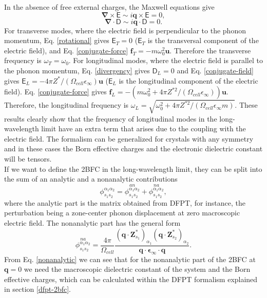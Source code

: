 In the absence of free external charges, the Maxwell equations give
\begin{equation}
 \label{rotational}
\boldsymbol{\nabla}\times\boldsymbol{\mathsf{E}}\sim i\mathbf{q}\times\boldsymbol{\mathsf{E}}=0,
\end{equation}
\begin{equation}
 \label{divergency}
\boldsymbol{\nabla}\cdot\boldsymbol{\mathsf{D}}\sim i\mathbf{q}\cdot\boldsymbol{\mathsf{D}}=0.
\end{equation}
For transverse modes, where the electric field is perpendicular to the phonon momentum, Eq. \ref{rotational} gives $\boldsymbol{\mathsf{E}}_{T}=0$ ($\boldsymbol{\mathsf{E}}_{T}$ is the transversal component of the electric 
field), and Eq. \ref{conjugate-force} $\mathbf{f}_{T}=-m\omega_{0}^{2}\mathbf{u}$. Therefore the transverse frequency is $\omega_{T}=\omega_{0}$. For longitudinal modes, where the electric field is parallel to the phonon 
momentum, Eq. \ref{divergency} gives $\boldsymbol{\mathsf{D}}_{L}=0$ and Eq. \ref{conjugate-field} gives $\boldsymbol{\mathsf{E}}_{L}=-4\pi Z^{*}/(\Omega_{cell}\epsilon_{\infty})\mathbf{u}$ ($\boldsymbol{\mathsf{E}}_{L}$ is the 
longitudinal component of the electric field). Eq. \ref{conjugate-force} gives $\mathbf{f}_{L}=-(m\omega_{0}^{2}+4\pi Z^{*2}/(\Omega_{cell}\epsilon_{\infty}))\mathbf{u}$. Therefore, the longitudinal frequency 
is $\omega_{L}=\sqrt{\omega_{0}^{2}+4\pi Z^{*2}/(\Omega_{cell}\epsilon_{\infty}m)}$. These results clearly show that the frequency of longitudinal modes in the long-wavelength limit have an extra term that arises due to the 
coupling with the electric field. The formalism can be generalized for crystals with any symmetry and in these cases the Born effective charges and the electronic dielectric constant will be tensors. \\

If we want to define the 2BFC in the long-wavelength limit, they can be split into the sum of an analytic and a nonanalytic contributions
\begin{equation}
 \phi_{s_{1}s_{2}}^{\alpha_{1}\alpha_{2}}=\overset{an}{\phi_{s_{1}s_{2}}^{\alpha_{1}\alpha_{2}}}+\overset{na}{\phi_{s_{1}s_{2}}^{\alpha_{1}\alpha_{2}}},
\end{equation}
where the analytic part is the matrix obtained from DFPT, for instance, the perturbation being a zone-center phonon displacement at zero macroscopic electric field. The nonanalytic part has the general form
\begin{equation}
\label{nonanalytic}
\overset{na}{\phi_{s_{1}s_{2}}^{\alpha_{1}\alpha_{2}}}=\frac{4\pi}{\Omega_{cell}}\frac{(\mathbf{q}\cdot\mathbf{Z}^{*}_{s_{1}})_{\alpha_{1}}(\mathbf{q}\cdot\mathbf{Z}^{*}_{s_{2}})_{\alpha_{2}}}{\mathbf{q}\cdot\boldsymbol{
\epsilon}_{\infty}\cdot\mathbf{q}}.
\end{equation}
From Eq. \ref{nonanalytic} we can see that for the nonanalytic part of the 2BFC at $\mathbf{q}=0$ we need the macroscopic dielectric constant of the system and the Born effective charges, which can be calculated within
the DFPT formalism explained in section \ref{dfpt-2bfc}\cite{gonze1997dynamical}. \\

